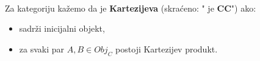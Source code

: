   \begin{definition}\ \\
  
    \noindent Za kategoriju  kažemo da je \textbf{Kartezijeva} (skraćeno:
    " je \textbf{CC}") ako:
    \begin{itemize}
      \item sadrži inicijalni objekt,
      \item za svaki par $A, B \in Obj_C$ postoji Kartezijev produkt.\\
    \end{itemize}
  \end{definition}
  
  \begin{example}\ \\
  

\end{example}

